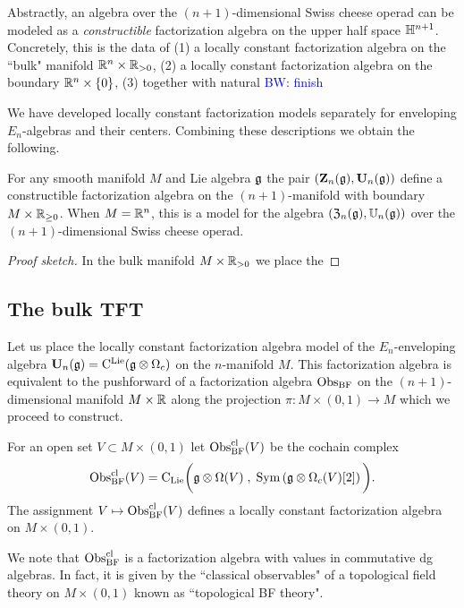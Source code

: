 \documentclass[11pt]{amsart}
\numberwithin{equation}{section}
\def\brian{\textcolor{blue}{BW: }\textcolor{blue}}
\begin{document}
Abstractly, an algebra over the $(n+1)$-dimensional Swiss cheese operad can be modeled as a {\em constructible} factorization algebra on the upper half space $\mathbb H^{n+1}$. 
Concretely, this is the data of (1) a locally constant factorization algebra on the ``bulk" manifold $\mathbb R^n \times \mathbb R_{>0}$, (2) a locally constant factorization algebra on the boundary $\mathbb R^n \times \{0\}$, (3) together with natural \brian{finish}

We have developed locally constant factorization models separately for enveloping $E_n$-algebras and their centers.
Combining these descriptions we obtain the following.

\begin{prp}
For any smooth manifold $M$ and Lie algebra $\mathfrak g$ the pair $(\mathbf Z_n(\mathfrak g), \mathbf U_n (\mathfrak g))$ define a constructible factorization algebra on the $(n+1)$-manifold with boundary $M \times \mathbb R_{\geq 0}$.
When $M = \mathbb R^n$, this is a model for the algebra $(\mathfrak Z_n(\mathfrak g), \mathbb U_n(\mathfrak g))$ over the $(n+1)$-dimensional Swiss cheese operad.
\end{prp}

\begin{proof}[Proof sketch]
In the bulk manifold $M \times \mathbb R_{>0}$ we place the 
\end{proof}

\subsection{The bulk TFT}

Let us place the locally constant factorization algebra model of the $E_n$-enveloping algebra $\mathbf U_n (\mathfrak g) = {\rm C}^{\rm Lie}(\mathfrak g \otimes \Omega_c)$ on the $n$-manifold $M$.
This factorization algebra is equivalent to the pushforward of a factorization algebra ${\rm Obs}_{\rm BF}$ on the $(n+1)$-dimensional manifold $M \times \mathbb R$ along the projection $\pi : M \times (0,1) \to M$ which we proceed to construct. 

\begin{dfn}
For an open set $V \subset M \times (0,1)$ let ${\rm Obs}^{\rm cl}_{\rm BF} (V)$ be the cochain complex 
\[
{\rm Obs}^{\rm cl}_{\rm BF} (V) = {\rm C}_{{\rm Lie}} \bigg(\mathfrak g \otimes \Omega (V) \; , \; {\rm Sym} \left(\mathfrak g \otimes \Omega_c(V) [2] \right) \bigg) .
\]
The assignment $V \mapsto {\rm Obs}^{\rm cl}_{\rm BF}(V)$ defines a locally constant factorization algebra on $M \times (0,1)$. 
\end{dfn}

We note that ${\rm Obs}_{\rm BF}^{\rm cl}$ is a factorization algebra with values in commutative dg algebras. 
In fact, it is given by the ``classical observables" of a topological field theory on $M \times (0,1)$ known as ``topological BF theory". 
\end{document}
